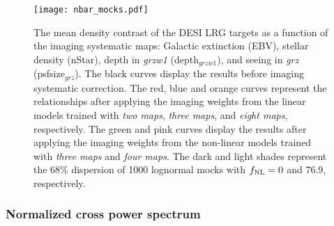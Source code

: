 \begin{figure}
\centering
\texttt{[image: nbar\_mocks.pdf]}
\caption{The mean density contrast of the DESI LRG targets as a function of the imaging systematic maps: Galactic extinction (EBV), stellar density (nStar), depth in \textit{grzw1} (depth$_{grzw1}$), and seeing in \textit{grz} (psfsize$_{grz}$). The black curves display the results before imaging systematic correction. The red, blue and orange curves represent the relationships after applying the imaging weights from the linear models trained with \textit{two maps}, \textit{three maps}, and \textit{eight maps}, respectively. The green and pink curves display the results after applying the imaging weights from the non-linear models trained with \textit{three maps} and \textit{four maps}. The dark and light shades represent the $68\%$ dispersion of 1000 lognormal mocks with $f_{\rm NL}=0$ and $76.9$, respectively.}\label{fig:nbarmock}
\end{figure}

\subsubsection{Normalized cross power spectrum}

